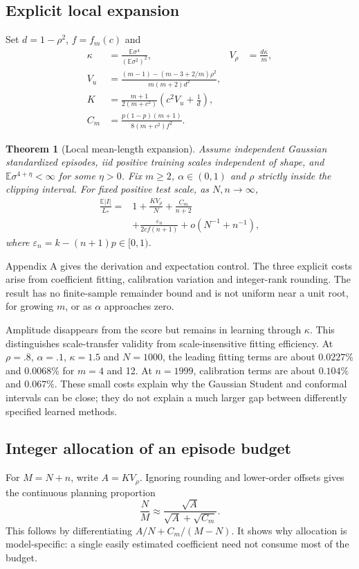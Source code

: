 \documentclass[nolineno]{ieeeaccess}
\newtheorem{theorem}{Theorem}
\newcommand{\E}{\mathbb{E}}
\begin{document}
\subsection{Explicit local expansion}
Set $d=1-\rho^2$, $f=f_m(c)$ and
\begin{align}
\kappa&=\frac{\E\sigma^4}{(\E\sigma^2)^2},&
V_\rho&=\frac{d\kappa}{m},\nonumber\\
V_u&=\frac{(m-1)-(m-3+2/m)\rho^2}{m(m+2)d^2},\nonumber\\
K&=\frac{m+1}{2(m+c^2)}\left(c^2V_u+\frac1d\right),\nonumber\\
C_m&=\frac{p(1-p)(m+1)}{8(m+c^2)f^2}.
\label{eq:constants}
\end{align}
\begin{theorem}[Local mean-length expansion]\label{thm:expansion}
Assume independent Gaussian standardized episodes, iid positive training scales independent of shape, and $\E\sigma^{4+\eta}<\infty$ for some $\eta>0$. Fix $m\geq2$, $\alpha\in(0,1)$ and $\rho$ strictly inside the clipping interval. For fixed positive test scale, as $N,n\to\infty$,
\begin{equation}
\begin{aligned}
\frac{\E|I|}{L_*}
={}&1+\frac{KV_\rho}{N}+\frac{C_m}{n+2}
\\ &+\frac{\varepsilon_n}{2cf(n+1)}
+o(N^{-1}+n^{-1}),
\end{aligned}
\label{eq:expansion}
\end{equation}
where $\varepsilon_n=k-(n+1)p\in[0,1)$.
\end{theorem}
Appendix A gives the derivation and expectation control. The three explicit costs arise from coefficient fitting, calibration variation and integer-rank rounding. The result has no finite-sample remainder bound and is not uniform near a unit root, for growing $m$, or as $\alpha$ approaches zero.

Amplitude disappears from the score but remains in learning through $\kappa$. This distinguishes scale-transfer validity from scale-insensitive fitting efficiency. At $\rho=.8$, $\alpha=.1$, $\kappa=1.5$ and $N=1000$, the leading fitting terms are about $0.0227\%$ and $0.0068\%$ for $m=4$ and 12. At $n=1999$, calibration terms are about $0.104\%$ and $0.067\%$. These small costs explain why the Gaussian Student and conformal intervals can be close; they do not explain a much larger gap between differently specified learned methods.

\subsection{Integer allocation of an episode budget}
For $M=N+n$, write $A=KV_\rho$. Ignoring rounding and lower-order offsets gives the continuous planning proportion
\begin{equation}
\frac{N}{M}\approx
\frac{\sqrt A}{\sqrt A+\sqrt{C_m}}.
\label{eq:continuousplan}
\end{equation}
This follows by differentiating $A/N+C_m/(M-N)$. It shows why allocation is model-specific: a single easily estimated coefficient need not consume most of the budget.
\end{document}
